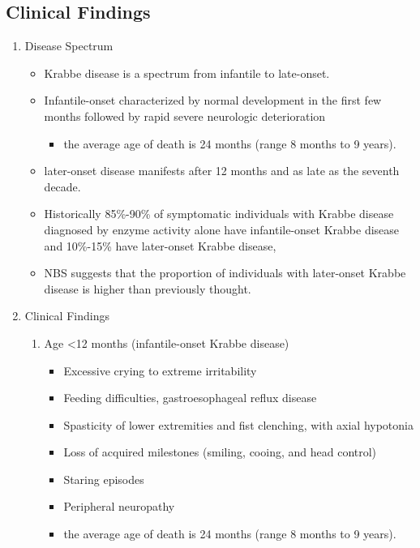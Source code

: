 \documentclass{scrartcl}
\begin{document}
\subsection{Clinical Findings}
\label{sec:org177a681}
\begin{enumerate}
\item Disease Spectrum
\label{sec:orgc21cd7a}
\begin{itemize}
\item Krabbe disease is a spectrum from infantile to late-onset.

\item Infantile-onset characterized by normal development in the first few
months followed by rapid severe neurologic deterioration
\begin{itemize}
\item the average age of death is 24 months (range 8 months to 9 years).
\end{itemize}

\item later-onset disease manifests after 12 months and as late as the
seventh decade.

\item Historically 85\%-90\% of symptomatic individuals with Krabbe disease
diagnosed by enzyme activity alone have infantile-onset Krabbe
disease and 10\%-15\% have later-onset Krabbe disease,

\item NBS suggests that the proportion of individuals with later-onset
Krabbe disease is higher than previously thought.
\end{itemize}

\item Clinical Findings
\label{sec:orgdba5f40}

\begin{enumerate}
\item Age <12 months (infantile-onset Krabbe disease)
\label{sec:orgf260e15}

\begin{itemize}
\item Excessive crying to extreme irritability
\item Feeding difficulties, gastroesophageal reflux disease
\item Spasticity of lower extremities and fist clenching, with axial hypotonia
\item Loss of acquired milestones (smiling, cooing, and head control)
\item Staring episodes
\item Peripheral neuropathy
\item the average age of death is 24 months (range 8 months to 9 years).
\end{itemize}


\end{enumerate}
\end{enumerate}
\end{document}
